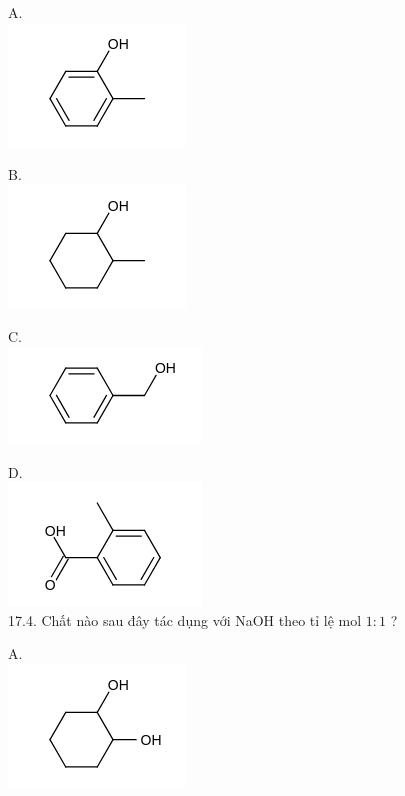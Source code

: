 \documentclass[10pt]{article}
\begin{document}
A.\\
\includegraphics{smile-db0f6a05a9039b17c9141e9a9f583cfcc060e279}

B.\\
\includegraphics{smile-262ef1533714e7d5c13defb5bb476862330e4791}

C.\\
\includegraphics{smile-76d4b5d27d9b85b9fbfffbdf77cfaebe50db2582}

D.\\
\includegraphics{smile-9ba7ccd22af3764c706e97631eab0269165728bf}\\
17.4. Chất nào sau đây tác dụng với NaOH theo tỉ lệ mol $1: 1$ ?

A.\\
\includegraphics{smile-458c66f0fdda8b8f6de9b39ac91f35471f0b15d3}
\end{document}

